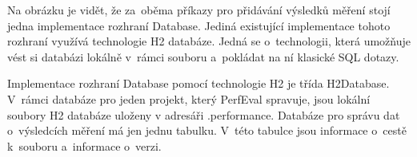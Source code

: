 Na obrázku je vidět, že za~oběma příkazy pro přidávání výsledků měření stojí jedna implementace rozhraní Database.
Jediná existující implementace tohoto rozhraní využívá technologie H2 databáze. Jedná se o~technologii, která umožňuje
vést si databázi lokálně v~rámci souboru a~pokládat na ní klasické SQL dotazy.

Implementace rozhraní Database pomocí technologie H2 je třída H2Database. V~rámci databáze pro jeden projekt, který
PerfEval spravuje, jsou lokální soubory H2 databáze uloženy v adresáři .performance. Databáze pro správu dat o~výsledcích
měření má jen jednu tabulku. V~této tabulce jsou informace o~cestě k~souboru a~informace o~verzi.

